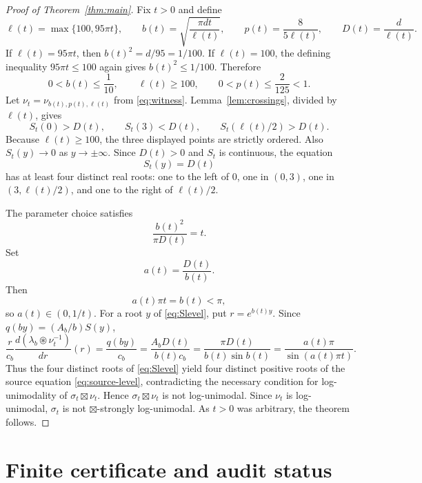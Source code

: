 \documentclass[11pt]{article}
\begin{document}
\begin{proof}[Proof of Theorem~\ref{thm:main}]
Fix $t>0$ and define
\begin{equation}\label{eq:path}
 \ell(t)=\max\{100,95\pi t\},
 \qquad
 b(t)=\sqrt{\frac{\pi d t}{\ell(t)}},
 \qquad
 p(t)=\frac{8}{5\ell(t)},
 \qquad
 D(t)=\frac{d}{\ell(t)}.
\end{equation}
If $\ell(t)=95\pi t$, then $b(t)^2=d/95=1/100$. If $\ell(t)=100$, the defining inequality $95\pi t\le100$ again gives $b(t)^2\le1/100$. Therefore
\begin{equation}\label{eq:range}
 0<b(t)\le\frac1{10},\qquad \ell(t)\ge100,
 \qquad 0<p(t)\le\frac2{125}<1.
\end{equation}
Let $\nu_t=\nu_{b(t),p(t),\ell(t)}$ from \eqref{eq:witness}. Lemma~\ref{lem:crossings}, divided by $\ell(t)$, gives
\[
 S_t(0)>D(t),\qquad S_t(3)<D(t),\qquad S_t(\ell(t)/2)>D(t).
\]
Because $\ell(t)\ge100$, the three displayed points are strictly ordered. Also $S_t(y)\to0$ as $y\to\pm\infty$. Since $D(t)>0$ and $S_t$ is continuous, the equation
\begin{equation}\label{eq:Slevel}
 S_t(y)=D(t)
\end{equation}
has at least four distinct real roots: one to the left of $0$, one in $(0,3)$, one in $(3,\ell(t)/2)$, and one to the right of $\ell(t)/2$.

The parameter choice satisfies
\begin{equation}\label{eq:timeid}
 \frac{b(t)^2}{\pi D(t)}=t.
\end{equation}
Set
\[
 a(t)=\frac{D(t)}{b(t)}.
\]
Then
\[
 a(t)\pi t=b(t)<\pi,
\]
so $a(t)\in(0,1/t)$. For a root $y$ of \eqref{eq:Slevel}, put $r=e^{b(t)y}$. Since $q(by)=(A_b/b)S(y)$,
\[
 \frac{r}{c_b}\frac{d(\lambda_b\circledast\nu_t^{-1})}{dr}(r)
 =\frac{q(by)}{c_b}
 =\frac{A_bD(t)}{b(t)c_b}
 =\frac{\pi D(t)}{b(t)\sin b(t)}
 =\frac{a(t)\pi}{\sin(a(t)\pi t)}.
\]
Thus the four distinct roots of \eqref{eq:Slevel} yield four distinct positive roots of the source equation \eqref{eq:source-level}, contradicting the necessary condition for log-unimodality of $\sigma_t\boxtimes\nu_t$. Hence $\sigma_t\boxtimes\nu_t$ is not log-unimodal. Since $\nu_t$ is log-unimodal, $\sigma_t$ is not $\boxtimes$-strongly log-unimodal. As $t>0$ was arbitrary, the theorem follows.
\end{proof}

\section{Finite certificate and audit status}
\end{document}
